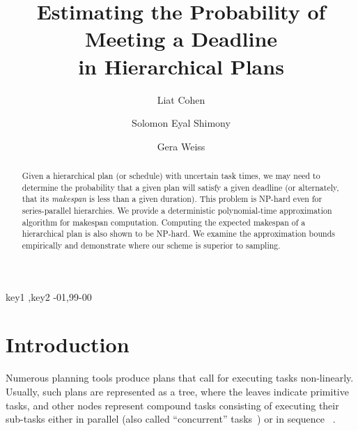 \documentclass[review]{elsarticle}
\begin{document}
\begin{frontmatter}

\title{Estimating the Probability of Meeting a Deadline \\ in Hierarchical Plans}

\author{Liat Cohen}
\author{Solomon Eyal Shimony}
\author{Gera Weiss}
\address{Computer Science Department\\
Ben Gurion University of The Negev\\
Beer-Sheva, Israel 84105\\}

\begin{abstract}
	Given a hierarchical plan (or schedule) with uncertain task times, we may need to determine the probability that a given plan will satisfy a given deadline (or alternately, that its {\em makespan} is less than a given duration). This problem is NP-hard even for series-parallel hierarchies. We provide a deterministic polynomial-time approximation algorithm for makespan computation. 
	Computing the expected makespan of a hierarchical plan is also shown to be NP-hard. We examine the approximation bounds empirically and demonstrate 
	where our scheme is superior to sampling.%
\end{abstract}  

\begin{keyword}
key1 \sep key2
-01\sep  99-00
\end{keyword}

\end{frontmatter}

\linenumbers





\section{Introduction}

Numerous planning tools produce plans that call for executing tasks non-linearly.
Usually, such plans are represented as a tree, where the
leaves indicate primitive tasks, and other nodes represent compound tasks consisting of executing their sub-tasks either in parallel (also called ``concurrent'' tasks~\cite{gabaldon2002programming}) or in sequence ~\cite{erol1994htn,nau1998control,nau2003shop2,kelly2008offline}.
\end{document}
